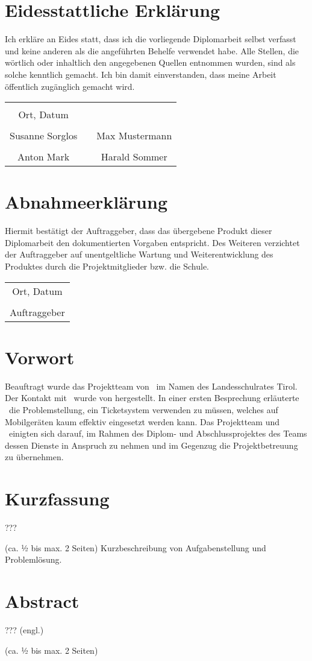 \chapter*{Eidesstattliche Erklärung}
Ich erkläre an Eides statt, dass ich die vorliegende Diplomarbeit selbst verfasst und keine anderen als die angeführten Behelfe verwendet habe. Alle Stellen, die wörtlich oder inhaltlich den angegebenen Quellen entnommen wurden, sind als solche kenntlich gemacht.
Ich bin damit einverstanden, dass meine Arbeit öffentlich zugänglich gemacht wird.

\vspace{1cm}
\begin{tabular}{c c c}
	& \hspace{4cm} & \\\cline{1-1}
	Ort, Datum & & \\
	\vspace{2cm}
	& & \\\cline{1-1}\cline{3-3}
	Susanne Sorglos & & Max Mustermann \\ 
	\vspace{2cm}
	& & \\\cline{1-1}\cline{3-3}
	Anton Mark & & Harald Sommer \\ 
\end{tabular}

\chapter*{Abnahmeerklärung}
Hiermit bestätigt der Auftraggeber, dass das übergebene Produkt dieser Diplomarbeit den dokumentierten Vorgaben entspricht. Des Weiteren verzichtet der Auftraggeber auf unentgeltliche Wartung und Weiterentwicklung des Produktes durch die Projektmitglieder bzw. die Schule.

\vspace{1cm}
\begin{tabular}{c}
	\\\cline{1-1}
	Ort, Datum\\
	\vspace{2cm}
	\\\cline{1-1}
	Auftraggeber
\end{tabular}	

\chapter*{Vorwort}
Beauftragt wurde das Projektteam von \getHammerl\ im Namen des Landesschulrates Tirol. Der Kontakt mit \getHammerl\ wurde von \getAlex hergestellt. In einer ersten Besprechung erläuterte \getHammerl\ die Problemstellung, ein Ticketsystem verwenden zu müssen, welches auf Mobilgeräten kaum effektiv eingesetzt werden kann. Das Projektteam und \getHammerl\ einigten sich darauf, im Rahmen des Diplom- und Abschlussprojektes des Teams dessen Dienste in Anspruch zu nehmen und im Gegenzug die Projektbetreuung zu übernehmen.


\chapter*{Kurzfassung}
???

(ca. ½ bis max. 2 Seiten)
Kurzbeschreibung von Aufgabenstellung und Problemlösung.

\chapter*{Abstract}
??? (engl.)

(ca. ½ bis max. 2 Seiten)